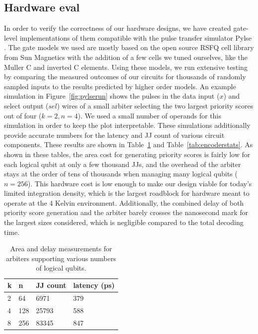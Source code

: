\subsection{Hardware eval}
In order to verify the correctness of our hardware designs, we have created gate-level implementations of them compatible with the pulse transfer simulator Pylse \cite{pylse}.
The gate models we used are mostly based on the open source RSFQ cell library from Sun Magnetics \cite{rsfqlib} with the addition of a few cells we tuned ourselves, like the Muller C and inverted C elements.
Using these models, we run extensive testing by comparing the measured outcomes of our circuits for thousands of randomly sampled inputs to the results predicted by higher order models.
An example simulation in Figure~\ref{fig:pylserun} shows the pulses in the data input ($x$) and select output ($sel$) wires of a small arbiter selecting the two largest priority scores out of four ($k=2,n=4$).
We used a small number of operands for this simulation in order to keep the plot interpretable.
These simulations additionally provide accurate numbers for the latency and JJ count of various circuit components.
These results are shown in Table~\ref{tab:arbstats} and Table~\ref{tab:encoderstats}.
As shown in these tables, the area cost for generating priority scores is fairly low for each logical qubit at only a few thousand JJs, and the overhead of the arbiter stays at the order of tens of thousands when managing many logical qubits ($n=256$).
This hardware cost is low enough to make our design viable for today's limited integration density, which is the largest roadblock for hardware meant to operate at the 4 Kelvin environment.
Additionally, the combined delay of both priority score generation and the arbiter barely crosses the nanosecond mark for the largest sizes considered, which is negligible compared to the total decoding time.



\begin{table}[]
\caption{Area and delay measurements for arbiters supporting various numbers of logical qubits.}
\label{tab:arbstats}
\begin{tabular}{|l|l|l|l|}
\hline
k & n   & JJ count & latency (ps) \\ \hline
2 & 64  & 6971     & 379          \\ \hline
4 & 128 & 25793    & 588          \\ \hline
8 & 256 & 83345    & 847          \\ \hline
\end{tabular}
\end{table}

